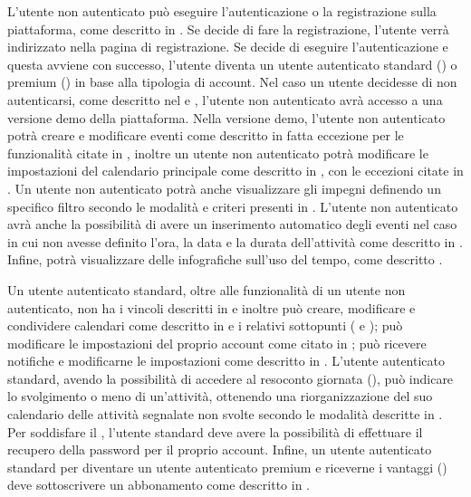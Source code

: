 \begin{listaPersonale}[DC]{}
    L'utente non autenticato può eseguire l'autenticazione o la registrazione sulla piattaforma, come descritto in . Se decide di fare la registrazione, l'utente verrà indirizzato nella pagina di registrazione. Se decide di eseguire l'autenticazione e questa avviene con successo, l'utente diventa un utente autenticato standard () o premium () in base alla tipologia di account. Nel caso un utente decidesse di non autenticarsi, come descritto nel  e , l'utente non autenticato avrà accesso a una versione demo della piattaforma. Nella versione demo, l'utente non autenticato potrà creare e modificare eventi come descritto in  fatta eccezione per le funzionalità citate in , inoltre un utente non autenticato potrà modificare le impostazioni del calendario principale come descritto in , con le eccezioni citate in . Un utente non autenticato potrà anche visualizzare gli impegni definendo un specifico filtro secondo le modalità e criteri presenti in . L'utente non autenticato avrà anche la possibilità di avere un inserimento automatico degli eventi nel caso in cui non avesse definito l'ora, la data e la durata dell'attività come descritto in . Infine, potrà visualizzare delle infografiche sull'uso del tempo, come descritto .

    Un utente autenticato standard, oltre alle funzionalità di un utente non autenticato, non ha i vincoli descritti in  e inoltre può creare, modificare e condividere calendari come descritto in  e i relativi sottopunti ( e ); può modificare le impostazioni del proprio account come citato in ; può ricevere notifiche e modificarne le impostazioni come descritto in . L'utente autenticato standard, avendo la possibilità di accedere al resoconto giornata (), può indicare lo svolgimento o meno di un'attività, ottenendo una riorganizzazione del suo calendario delle attività segnalate non svolte secondo le modalità descritte in . Per soddisfare il , l'utente standard deve avere la possibilità di effettuare il recupero della password per il proprio account. Infine, un utente autenticato standard per diventare un utente autenticato premium e riceverne i vantaggi () deve sottoscrivere un abbonamento come descritto in .


\end{listaPersonale}

